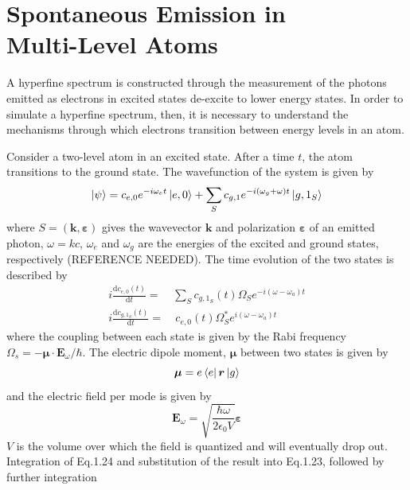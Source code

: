 \documentclass[12pt,a4paper,margin=1in]{report}
\begin{document}
\section{Spontaneous Emission in \\ Multi-Level Atoms}
\label{ALI}
A hyperfine spectrum is constructed through the measurement of the photons emitted as electrons in excited states de-excite to lower energy states. In order to simulate a hyperfine spectrum, then, it is necessary to understand the mechanisms through which electrons transition between energy levels in an atom.

Consider a two-level atom in an excited state. After a time $t$, the atom transitions to the ground state. The wavefunction of the system is given by
\begin{equation}
\ket{\psi} = c_{e,0}e^{-i\omega_et}\ket{e,0} + \sum_Sc_{g,1}e^{-i(\omega_g+\omega)t}\ket{g,1_S}
\end{equation}
where $S = (\bm{k},\bm{\varepsilon})$ gives the wavevector $\bm{k}$ and polarization $\bm{\varepsilon}$ of an emitted photon, $\omega = kc$, $\omega_e$ and $\omega_g$ are the energies of the excited and ground states, respectively (REFERENCE NEEDED). The time evolution of the two states is described by
\begin{align}
i\frac{\mathrm{d}c_{e,0}(t)}{\mathrm{d}t} =& \sum_Sc_{g,1_S}(t)\Omega_S e^{-i(\omega-\omega_a)t}\\
i\frac{\mathrm{d}c_{g,1_S}(t)}{\mathrm{d}t} =& \ c_{e,0}(t)\Omega_S^*e^{i(\omega-\omega_a)t}
\end{align}
where the coupling between each state is given by the Rabi frequency \\$\Omega_s = -\bm{\mu}\cdot\bm{E}_{\omega}/\hbar$. The electric dipole moment, $\bm{\mu}$ between two states is given by
\begin{equation}
\bm{\mu} = e\bra{e}\bm{r}\ket{g} 
\end{equation}
and the electric field per mode is given by
\begin{equation}
\bm{E}_{\omega} = \sqrt{\frac{\hbar\omega}{2\epsilon_0V}}\bm{\varepsilon}
\end{equation}
$V$ is the volume over which the field is quantized and will eventually drop out. Integration of Eq.1.24 and substitution of the result into Eq.1.23, followed by further integration  
\end{document}
